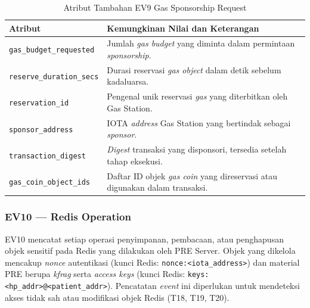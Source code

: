 \begin{table}[htbp]
\centering
\caption{Atribut Tambahan EV9 Gas Sponsorship Request}
\label{tab:ev9-detail}
\renewcommand{\arraystretch}{1.3}
\begin{tabular}{|p{4cm}|p{7.5cm}|}
\hline
\textbf{Atribut} & \textbf{Kemungkinan Nilai dan Keterangan} \\
\hline
\texttt{gas\_budget\_requested} &
Jumlah \textit{gas budget} yang diminta dalam permintaan \textit{sponsorship}. \\
\hline
\texttt{reserve\_duration\_secs} &
Durasi reservasi \textit{gas object} dalam detik sebelum kadaluarsa. \\
\hline
\texttt{reservation\_id} &
Pengenal unik reservasi \textit{gas} yang diterbitkan oleh Gas Station. \\
\hline
\texttt{sponsor\_address} &
IOTA \textit{address} Gas Station yang bertindak sebagai \textit{sponsor}. \\
\hline
\texttt{transaction\_digest} &
\textit{Digest} transaksi yang disponsori, tersedia setelah tahap eksekusi. \\
\hline
\texttt{gas\_coin\_object\_ids} &
Daftar ID objek \textit{gas coin} yang direservasi atau digunakan dalam
transaksi. \\
\hline
\end{tabular}
\end{table}

\subsubsection{EV10 --- Redis Operation}
\label{subsec:ev10-redis-operation}

EV10 mencatat setiap operasi penyimpanan, pembacaan, atau penghapusan objek
sensitif pada Redis yang dilakukan oleh PRE Server. Objek yang dikelola
mencakup \textit{nonce} autentikasi (kunci Redis: \texttt{nonce:<iota\_address>})
dan material PRE berupa \textit{kfrag} serta \textit{access keys} (kunci Redis:
\texttt{keys:<hp\_addr>@<patient\_addr>}). Pencatatan \textit{event} ini
diperlukan untuk mendeteksi akses tidak sah atau modifikasi objek Redis (T18,
T19, T20).


